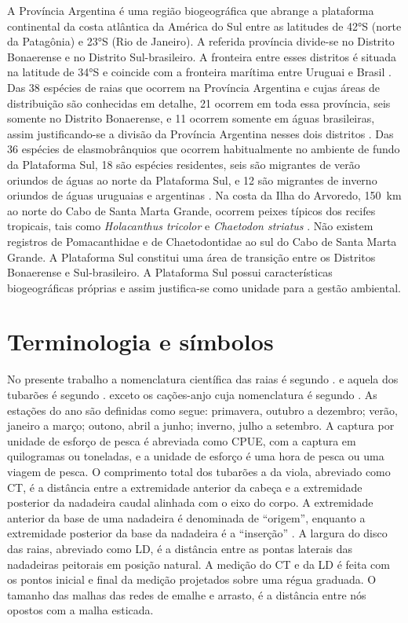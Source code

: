 \documentclass[a4paper,11pt,twoside,showtrims,onecolumn,openright,final]{memoir}
\begin{document}
A Província Argentina é uma região biogeográfica que abrange a plataforma continental 
da costa atlântica da América do Sul entre as latitudes de 42°S (norte da Patagônia) 
e 23°S (Rio de Janeiro). A referida província divide-se no Distrito Bonaerense e 
no Distrito Sul-brasileiro. A fronteira entre esses distritos é situada na latitude 
de 34°S e coincide com a fronteira marítima entre Uruguai e Brasil \citep{menni2000}. %
Das 38 espécies de raias que ocorrem na Província Argentina e cujas áreas de distribuição 
são conhecidas em detalhe, 21 ocorrem em toda essa província, seis somente no Distrito Bonaerense,  
e 11 ocorrem somente em águas brasileiras, assim justificando-se a divisão da Província Argentina nesses dois 
distritos \citep{menni2000}. %
Das 36 espécies de elasmobrânquios que ocorrem habitualmente no ambiente de fundo da 
Plataforma Sul, 18 são espécies residentes, seis são migrantes de verão oriundos de águas 
ao norte da Plataforma Sul, e 12 são migrantes de inverno oriundos de águas uruguaias 
e argentinas \citep{vooren1997}. %
Na costa da Ilha do Arvoredo, 150~km ao norte do Cabo de Santa Marta Grande, ocorrem 
peixes típicos dos recifes tropicais, tais como \emph{Holacanthus tricolor} 
e \emph{Chaetodon striatus} \citep{pinheiro2005}. %
Não existem registros de Pomacanthidae e de Chaetodontidae ao sul do Cabo 
de Santa Marta Grande. A Plataforma Sul constitui uma área de transição entre os 
Distritos Bonaerense e Sul-brasileiro. A Plataforma Sul possui características 
biogeográficas  próprias e assim justifica-se como unidade para a gestão ambiental.

\section*{Terminologia e símbolos}

No presente trabalho a nomenclatura científica das raias é segundo \citet{menni2000}. %
e aquela dos tubarões é segundo \citet{compagno2005}. %
exceto os cações-anjo cuja nomenclatura é segundo \citet{vooren1991}. %
As estações do ano são definidas como segue: primavera, outubro a dezembro; 
verão, janeiro a março; outono, abril a junho; 
inverno, julho a setembro. A captura por unidade de esforço de pesca é abreviada 
como CPUE, com a captura em quilogramas ou toneladas, e a unidade de esforço é uma 
hora de pesca ou uma viagem de pesca.  O comprimento total dos tubarões a da viola, 
abreviado como CT, é a distância entre a extremidade anterior da cabeça e a extremidade 
posterior da nadadeira caudal alinhada com o eixo do corpo. A extremidade anterior da base 
de uma nadadeira é denominada de ``origem'', enquanto a extremidade posterior da base da 
nadadeira é a ``inserção'' \citep{COMPAGNO1984A}. %
A largura do disco das raias, abreviado como LD, é a distância entre as pontas laterais 
das nadadeiras peitorais em posição natural. A medição do CT e da LD é feita com os pontos 
inicial e final da medição projetados sobre uma régua graduada. 
O tamanho das malhas das redes de emalhe e arrasto, é a distância entre nós opostos
com a malha esticada.
\end{document}
